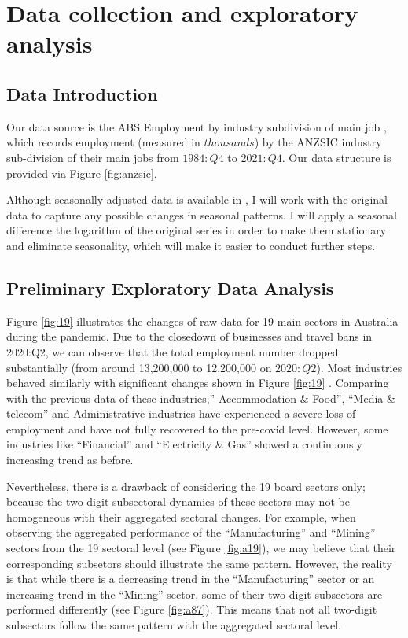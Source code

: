 \documentclass{monashthesis}
\begin{document}
\hypertarget{data-collection-and-exploratory-analysis}{%
\chapter{Data collection and exploratory analysis}\label{data-collection-and-exploratory-analysis}}

\hypertarget{data-introduction}{%
\section{Data Introduction}\label{data-introduction}}

Our data source is the ABS Employment by industry subdivision of main job \autocite{ABS2022}, which records employment (measured in \(thousands\)) by the ANZSIC industry sub-division of their main jobs from \(1984:Q4\) to \(2021:Q4\). Our data structure is provided via Figure \ref{fig:anzsic}.

Although seasonally adjusted data is available in \autocite{ABS2022}, I will work with the original data to capture any possible changes in seasonal patterns. I will apply a seasonal difference the logarithm of the original series in order to make them stationary and eliminate seasonality, which will make it easier to conduct further steps.

\hypertarget{preliminary-exploratory-data-analysis}{%
\section{Preliminary Exploratory Data Analysis}\label{preliminary-exploratory-data-analysis}}

\newpage

Figure \ref{fig:19} illustrates the changes of raw data for 19 main sectors in Australia during the pandemic. Due to the closedown of businesses and travel bans in 2020:Q2, we can observe that the total employment number dropped substantially (from around 13,200,000 to 12,200,000 on \(2020:Q2\)). Most industries behaved similarly with significant changes shown in Figure \ref{fig:19} . Comparing with the previous data of these industries,'' Accommodation \& Food'', ``Media \& telecom'' and Administrative industries have experienced a severe loss of employment and have not fully recovered to the pre-covid level. However, some industries like ``Financial'' and ``Electricity \& Gas'' showed a continuously increasing trend as before.

Nevertheless, there is a drawback of considering the 19 board sectors only; because the two-digit subsectoral dynamics of these sectors may not be homogeneous with their aggregated sectoral changes. For example, when observing the aggregated performance of the ``Manufacturing'' and ``Mining'' sectors from the 19 sectoral level (see Figure \ref{fig:a19}), we may believe that their corresponding subsetors should illustrate the same pattern. However, the reality is that while there is a decreasing trend in the ``Manufacturing'' sector or an increasing trend in the ``Mining'' sector, some of their two-digit subsectors are performed differently (see Figure \ref{fig:a87}). This means that not all two-digit subsectors follow the same pattern with the aggregated sectoral level.
\end{document}
